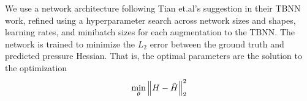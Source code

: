 We use a network architecture following Tian et.al's suggestion in their TBNN work\cite{tian2021}, refined using a hyperparameter search\cite{chollet2015keras} across network sizes and shapes, learning rates, and minibatch sizes for each augmentation to the TBNN. The network is trained to minimize the $L_2$ error between the ground truth and predicted pressure Hessian. That is, the optimal parameters are the solution to the optimization
\begin{equation}
  \min_\theta \left\lVert H - \hat{H}\right\rVert_2^2
\end{equation}



